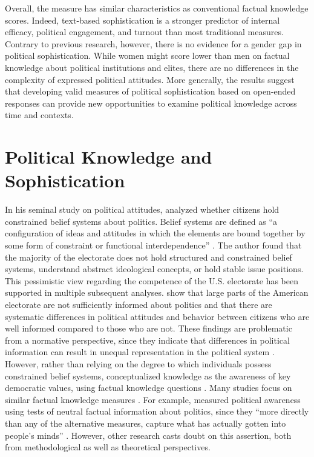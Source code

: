 \documentclass[12pt]{article}
\begin{document}
Overall, the measure has similar characteristics as conventional factual knowledge scores. Indeed, text-based sophistication is a stronger predictor of internal efficacy, political engagement, and turnout than most traditional measures. Contrary to previous research, however, there is no evidence for a gender gap in political sophistication. While women might score lower than men on factual knowledge about political institutions and elites, there are no differences in the complexity of expressed political attitudes. More generally, the results suggest that developing valid measures of political sophistication based on open-ended responses can provide new opportunities to examine political knowledge across time and contexts. 


\section*{Political Knowledge and Sophistication}

In his seminal study on political attitudes, \citet{converse1964nature} analyzed whether citizens hold constrained belief systems about politics. Belief systems are defined as ``a configuration of ideas and attitudes in which the elements are bound together by some form of constraint or functional interdependence'' \citep[207]{converse1964nature}. The author found that the majority of the electorate does not hold structured and constrained belief systems, understand abstract ideological concepts, or hold stable issue positions. This pessimistic view regarding the competence of the U.S. electorate has been supported in multiple subsequent analyses. \citet{carpini1996americans} show that large parts of the American electorate are not sufficiently informed about politics and that there are systematic differences in political attitudes and behavior between citizens who are well informed compared to those who are not. These findings are problematic from a normative perspective, since they indicate that differences in political information can result in unequal representation in the political system \citep[see also][]{althaus1998information,kuklinski2000misinformation,gilens2001political}. However, rather than relying on the degree to which individuals possess constrained belief systems, \citet{carpini1996americans} conceptualized knowledge as the awareness of key democratic values, using factual knowledge questions \citep[see also][]{carpini1993measuring}. Many studies focus on similar factual knowledge measures \citep[e.g.][]{zaller1991information,gomez2001political}. For example, \citet{zaller1992nature} measured political awareness using tests of neutral factual information about politics, since they ``more directly than any of the alternative measures, capture what has actually gotten into people’s minds'' \citep[21]{zaller1992nature}. However, other research casts doubt on this assertion, both from methodological as well as theoretical perspectives.
\end{document}
